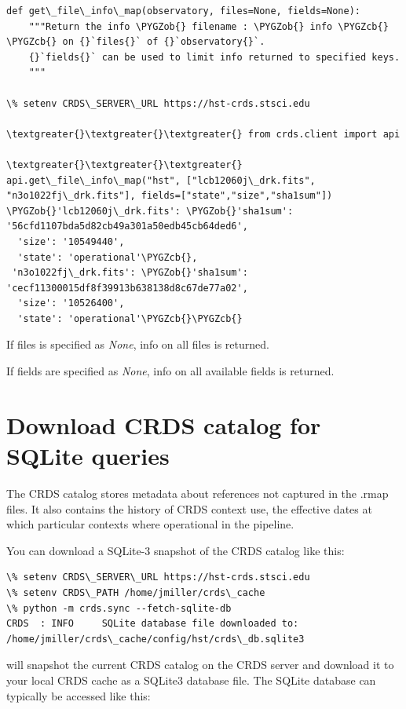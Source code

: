 \documentclass[letterpaper,10pt,english]{sphinxmanual}
\def\PYGZob{\char`\{}
\def\PYGZcb{\char`\}}
\begin{document}
\begin{Verbatim}[commandchars=\\\{\}]
def get\_file\_info\_map(observatory, files=None, fields=None):
    """Return the info \PYGZob{} filename : \PYGZob{} info \PYGZcb{} \PYGZcb{} on {}`files{}` of {}`observatory{}`.
    {}`fields{}` can be used to limit info returned to specified keys.
    """

\% setenv CRDS\_SERVER\_URL https://hst-crds.stsci.edu

\textgreater{}\textgreater{}\textgreater{} from crds.client import api

\textgreater{}\textgreater{}\textgreater{} api.get\_file\_info\_map("hst", ["lcb12060j\_drk.fits", "n3o1022fj\_drk.fits"], fields=["state","size","sha1sum"])
\PYGZob{}'lcb12060j\_drk.fits': \PYGZob{}'sha1sum': '56cfd1107bda5d82cb49a301a50edb45cb64ded6',
  'size': '10549440',
  'state': 'operational'\PYGZcb{},
 'n3o1022fj\_drk.fits': \PYGZob{}'sha1sum': 'cecf11300015df8f39913b638138d8c67de77a02',
  'size': '10526400',
  'state': 'operational'\PYGZcb{}\PYGZcb{}
\end{Verbatim}

If files is specified as \emph{None},  info on all files is returned.

If fields are specified as \emph{None},  info on all available fields is returned.


\section{Download CRDS catalog for SQLite queries}
\label{database:download-crds-catalog-for-sqlite-queries}
The CRDS catalog stores metadata about references not captured in the .rmap files.   It also contains
the history of CRDS context use,  the effective dates at which particular contexts where operational in
the pipeline.

You can download a SQLite-3 snapshot of the CRDS catalog like this:

\begin{Verbatim}[commandchars=\\\{\}]
\% setenv CRDS\_SERVER\_URL https://hst-crds.stsci.edu
\% setenv CRDS\_PATH /home/jmiller/crds\_cache
\% python -m crds.sync --fetch-sqlite-db
CRDS  : INFO     SQLite database file downloaded to: /home/jmiller/crds\_cache/config/hst/crds\_db.sqlite3
\end{Verbatim}

will snapshot the current CRDS catalog on the CRDS server and download it to your local CRDS cache as a
SQLite3 database file.  The SQLite database can typically be accessed like this:
\end{document}
